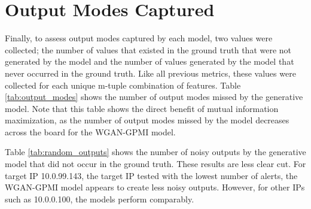 \section{Output Modes Captured}
\label{sec:output}
Finally, to assess output modes captured by each model, two values were collected; the number of values that existed in the ground truth that were not generated by the model and the number of values generated by the model that never occurred in the ground truth. Like all previous metrics, these values were collected for each unique m-tuple combination of features. Table \ref{tab:output_modes} shows the number of output modes missed by the generative model. Note that this table shows the direct benefit of mutual information maximization, as the number of output modes missed by the model decreases across the board for the WGAN-GPMI model.

Table \ref{tab:random_outputs} shows the number of noisy outputs by the generative model  that did not occur in the ground truth. These results are less clear cut. For target IP 10.0.99.143, the target IP tested with the lowest number of alerts, the WGAN-GPMI model appears to create less noisy outputs. However, for other IPs such as 10.0.0.100, the models perform comparably.

